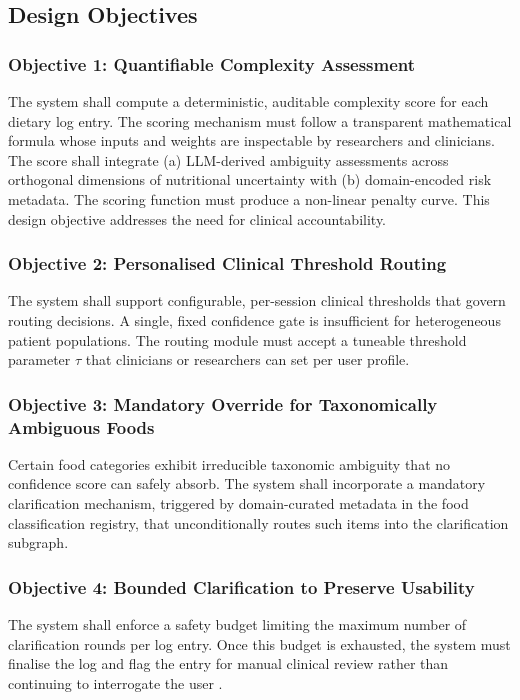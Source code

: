 \subsection{Design Objectives}
\label{sec:objectives}

\subsubsection{Objective 1: Quantifiable Complexity Assessment}
The system shall compute a deterministic, auditable complexity score for each dietary log entry. The scoring mechanism must follow a transparent mathematical formula whose inputs and weights are inspectable by researchers and clinicians. The score shall integrate (a) LLM-derived ambiguity assessments across orthogonal dimensions of nutritional uncertainty with (b) domain-encoded risk metadata. The scoring function must produce a non-linear penalty curve. This design objective addresses the need for clinical accountability.

\subsubsection{Objective 2: Personalised Clinical Threshold Routing}
The system shall support configurable, per-session clinical thresholds that govern routing decisions. A single, fixed confidence gate is insufficient for heterogeneous patient populations. The routing module must accept a tuneable threshold parameter $\tau$ that clinicians or researchers can set per user profile.

\subsubsection{Objective 3: Mandatory Override for Taxonomically Ambiguous Foods}
Certain food categories exhibit irreducible taxonomic ambiguity that no confidence score can safely absorb. The system shall incorporate a mandatory clarification mechanism, triggered by domain-curated metadata in the food classification registry, that unconditionally routes such items into the clarification subgraph.

\subsubsection{Objective 4: Bounded Clarification to Preserve Usability}
The system shall enforce a safety budget limiting the maximum number of clarification rounds per log entry. Once this budget is exhausted, the system must finalise the log and flag the entry for manual clinical review rather than continuing to interrogate the user \citep{nahStudyTolerableWaiting2004,hartDevelopmentNASATLXTask1988}.

